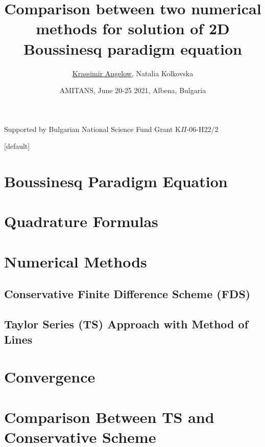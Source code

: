 \documentclass{beamer}
\begin{document}
\title{Comparison between two numerical methods for solution of 2D Boussinesq paradigm equation}

\author[K. Angelow]{{\underline{Krassimir Angelow}}, Natalia Kolkovska}
\date[2021]{AMITANS, June 20-25  2021,  Albena, Bulgaria}


\begin{frame}
 \titlepage
 \begin{center}
  Supported by Bulgarian National Science Fund Grant K$\Pi$-06-H22/2
  \end{center}
\end{frame}

\begin{frame}
\tableofcontents 
{}[default]
\section{Boussinesq Paradigm Equation}
\section{Quadrature Formulas}
\section{Numerical Methods}
\subsection{Conservative Finite Difference Scheme (FDS) }
\subsection{Taylor Series (TS) Approach with Method of Lines }
\section{Convergence}

\section{Comparison Between TS and Conservative Scheme}
\end{frame}
\end{document}
